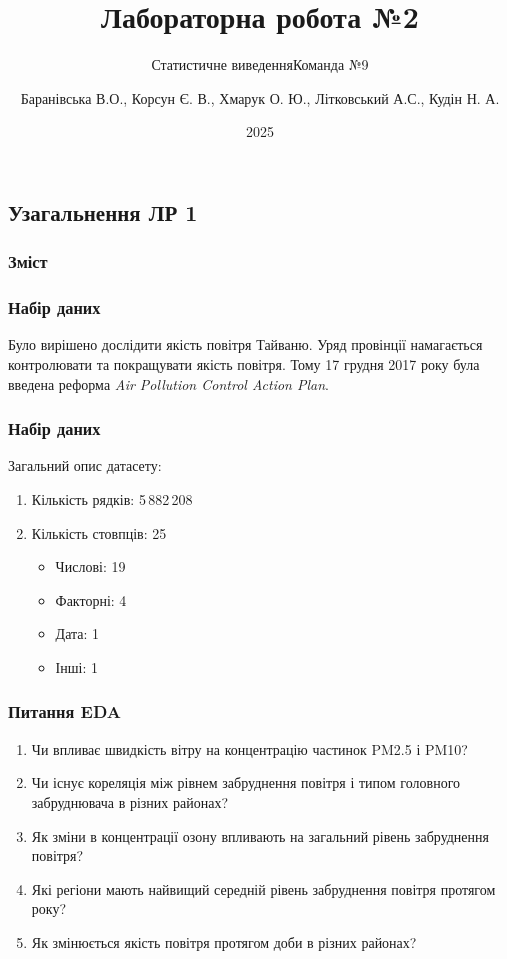 \documentclass{beamer}
\title{Лабораторна робота №2}
\subtitle{Статистичне виведення}
\subtitle{Команда №9}
\author[]{
  Баранівська В.О.,
  Корсун Є. В.,
  Хмарук О. Ю.,
  Літковський А.С.,
  Кудін Н. А.
}
\date{2025}
\begin{document}
\frame{\titlepage}

\graphicspath{{../../../}} %

\begin{frame}
  \section{Узагальнення ЛР 1}

  \frametitle{Зміст}
  \tableofcontents[currentsection]
\end{frame}

\begin{frame}
  \frametitle{Набір даних}

  Було вирішено дослідити якість повітря Тайваню. Уряд провінції намагається
  контролювати та покращувати якість повітря. Тому 17 грудня 2017 року була введена
  реформа \textit{Air Pollution Control Action Plan}.

  \begin{center}
    
  \end{center}
\end{frame}

\begin{frame}
  \frametitle{Набір даних}

  Загальний опис датасету:

  \begin{enumerate}
    \item Кількість рядків: 5\,882\,208
    \item Кількість стовпців: 25

    \begin{itemize}
      \item Числові: 19
      \item Факторні: 4
      \item Дата: 1
      \item Інші: 1
    \end{itemize}
  \end{enumerate}
\end{frame}

\begin{frame}
  \frametitle{Питання EDA}

  \begin{enumerate}
    \item Чи впливає швидкість вітру на концентрацію частинок PM2.5 і PM10?
    \item Чи існує кореляція між рівнем забруднення повітря і типом головного забруднювача
    в різних районах?
    \item Як зміни в концентрації озону  впливають на загальний рівень забруднення повітря?
    \item Які регіони мають найвищий середній рівень забруднення повітря протягом року?
    \item Як змінюється якість повітря протягом доби в різних районах?
  \end{enumerate}
\end{frame}
\end{document}
